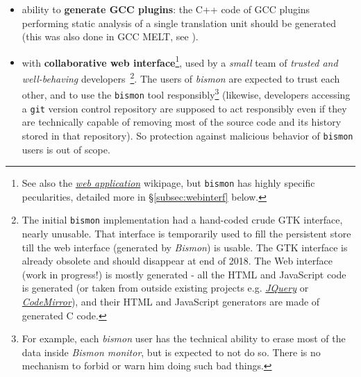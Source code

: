 \begin{itemize}
    \item ability to \textbf{generate GCC plugins}: the C++ code of
      GCC plugins  performing static analysis of a single translation
      unit should be generated (this was also done in GCC MELT, see \cite{Starynkevitch-DSL2011}).

    \item with \textbf{collaborative web interface}\footnote{See also the \href{https://en.wikipedia.org/wiki/Web\_application}{\emph{web application}} wikipage, but \texttt{bismon} has highly specific pecularities, detailed more in \S\ref{subsec:webinterf} below.},  used
      by a \emph{small} team of \emph{trusted and well-behaving}
      developers~\footnote{The initial \texttt{bismon} implementation
        had a hand-coded crude GTK interface, nearly unusable. That
        interface is temporarily used to fill the persistent store
        till the web interface (generated by \emph{Bismon}) is
        usable. The GTK interface is already obsolete and should
        disappear at end of 2018. The Web interface (work in
        progress!) is mostly generated - all the HTML and JavaScript
        code is generated (or taken from outside existing projects
        e.g. \href{http://jquery.com/}{\emph{JQuery}} or
        \href{http://codemirror.net/}{\emph{CodeMirror}}), and their
        HTML and JavaScript generators are made of generated C
        code.}. The users of \emph{bismon} are expected to trust each
      other, and to use the \texttt{bismon} tool
      responsibly\footnote{For example, each \emph{bismon} user has
        the technical ability to erase most of the data inside
        \textit{Bismon monitor}, but is expected to not do so. There
        is no mechanism to forbid or warn him doing such bad things.}
      (likewise, developers accessing a \texttt{git} version control
      repository are supposed to act responsibly even if they are
      technically capable of removing most of the source code and its
      history stored in that repository). So protection against
      malicious behavior of \texttt{bismon} users is out of scope.


\end{itemize}
